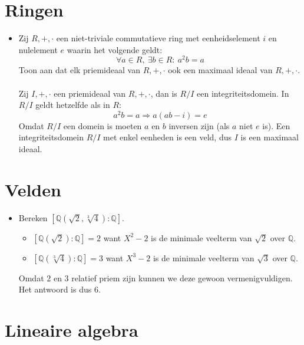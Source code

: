 \documentclass[main.tex]{subfiles}
\begin{document}
\section{Ringen}
\label{sec:ringen}

\begin{itemize}
\item Zij $R,+,\cdot$ een niet-triviale commutatieve ring met eenheidselement $i$ en nulelement $e$ waarin het volgende geldt:
  \[ \forall a\in R,\ \exists b\in R:\ a^{2}b=a \]
  Toon aan dat elk priemideaal van $R,+,\cdot$ ook een maximaal ideaal van $R,+,\cdot$.\\\\
  Zij $I,+,\cdot$ een priemideaal van $R,+,\cdot$, dan is $R/I$ een integriteitsdomein.
  In $R/I$ geldt hetzelfde als in $R$:
  \[ a^{2}b=a \Rightarrow a(ab-i)=e \]
  Omdat $R/I$ een domein is moeten $a$ en $b$ inversen zijn (als $a$ niet $e$ is).
  Een integriteitsdomein $R/I$ met enkel eenheden is een veld, dus $I$ is een maximaal ideaal.
\end{itemize}

\section{Velden}
\label{sec:velden}

\begin{itemize}
\item Bereken $[\mathbb{Q}(\sqrt{2},\sqrt[3]{4}):\mathbb{Q}]$.
  \begin{itemize}
  \item $[\mathbb{Q}(\sqrt{2}):\mathbb{Q}] = 2$ want $X^{2}-2$ is de minimale veelterm van $\sqrt{2}$ over $\mathbb{Q}$.
  \item $[\mathbb{Q}(\sqrt[3]{4}):\mathbb{Q}] = 3$ want $X^{3}-2$ is de minimale veelterm van $\sqrt{3}$ over $\mathbb{Q}$.
  \end{itemize}
  Omdat $2$ en $3$ relatief priem zijn kunnen we deze gewoon vermenigvuldigen.
  Het antwoord is dus $6$.
\end{itemize}


\section{Lineaire algebra}
\label{sec:lineaire-algebra}
\end{document}
